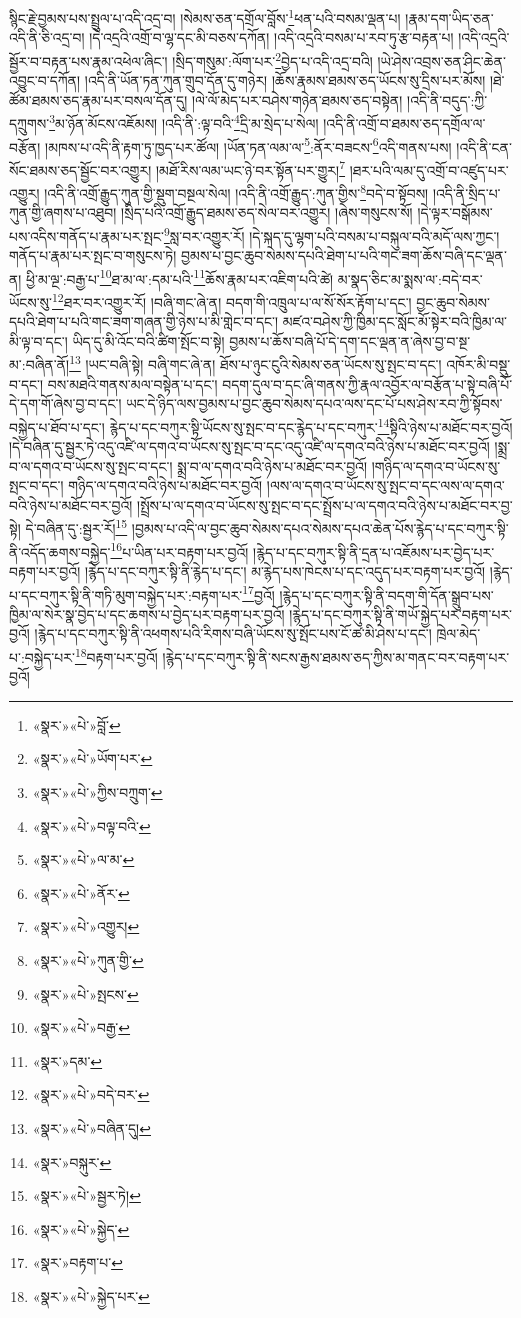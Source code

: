 སྙིང་རྗེ་བྱམས་པས་སྤྲུལ་པ་འདི་འདྲ་བ། །སེམས་ཅན་དགྲོལ་བློས་\footnote{«སྣར་»«པེ་»བློ་}ཕན་པའི་བསམ་ལྡན་པ། །རྣམ་དག་ཡིད་ཅན་འདི་ནི་ཅི་འདྲ་བ། །དེ་འདྲའི་འགྲོ་བ་ལྷ་དང་མི་བཅས་དཀོན། །འདི་འདྲའི་བསམ་པ་རབ་ཏུ་རྩ་བརྟན་པ། །འདི་འདྲའི་སྦྱོར་བ་བརྟན་པས་རྣམ་འཕེལ་ཞིང་། །སྲིད་གསུམ་:ལོག་པར་\footnote{«སྣར་»«པེ་»ཡོག་པར་}བྱེད་པ་འདི་འདྲ་བའི། །ཡེ་ཤེས་འབྲས་ཅན་ཤིང་ཆེན་འབྱུང་བ་དཀོན། །འདི་ནི་ཡོན་ཏན་ཀུན་གྲུབ་དོན་དུ་གཉེར། །ཆོས་རྣམས་ཐམས་ཅད་ཡོངས་སུ་དྲིས་པར་མོས། །ཐེ་ཚོམ་ཐམས་ཅད་རྣམ་པར་བསལ་དོན་དུ། །ལེ་ལོ་མེད་པར་བཤེས་གཉེན་ཐམས་ཅད་བསྟེན། །འདི་ནི་བདུད་:ཀྱི་དཀྲུགས་\footnote{«སྣར་»«པེ་»ཀྱིས་བཀྲུག་}མ་ཉོན་མོངས་འཇོམས། །འདི་ནི་:ལྟ་བའི་\footnote{«སྣར་»«པེ་»བལྟ་བའི་}དྲི་མ་སྲེད་པ་སེལ། །འདི་ནི་འགྲོ་བ་ཐམས་ཅད་དགྲོལ་ལ་བརྩོན། །མཁས་པ་འདི་ནི་རྟག་ཏུ་ཁྱད་པར་ཚོལ། །ཡོན་ཏན་ལམ་ལ་\footnote{«སྣར་»«པེ་»ལ་མ་}:ནོར་བཟངས་\footnote{«སྣར་»«པེ་»ནོར་}འདི་གནས་པས། །འདི་ནི་ངན་སོང་ཐམས་ཅད་སྦྱོང་བར་འགྱུར། །མཐོ་རིས་ལམ་ཡང་ཉེ་བར་སྟོན་པར་གྱུར།\footnote{«སྣར་»«པེ་»འགྱུར།} །ཐར་པའི་ལམ་དུ་འགྲོ་བ་འཛུད་པར་འགྱུར། །འདི་ནི་འགྲོ་རྒྱུད་ཀུན་གྱི་སྡུག་བསྔལ་སེལ། །འདི་ནི་འགྲོ་རྒྱུད་:ཀུན་གྱིས་\footnote{«སྣར་»«པེ་»ཀུན་གྱི་}བདེ་བ་སྟོབས། །འདི་ནི་སྲིད་པ་ཀུན་གྱི་ཞགས་པ་འཐུབ། །སྲིད་པའི་འགྲོ་རྒྱུད་ཐམས་ཅད་སེལ་བར་འགྱུར། །ཞེས་གསུངས་སོ། །དེ་ལྟར་བསྒོམས་པས་འདིས་གནོད་པ་རྣམ་པར་སྤང་\footnote{«སྣར་»«པེ་»སྤངས་}སླ་བར་འགྱུར་རོ། །དེ་སྐད་དུ་ལྷག་པའི་བསམ་པ་བསྐུལ་བའི་མདོ་ལས་ཀྱང་། གནོད་པ་རྣམ་པར་སྤང་བ་གསུངས་ཏེ། བྱམས་པ་བྱང་ཆུབ་སེམས་དཔའི་ཐེག་པ་པའི་གང་ཟག་ཆོས་བཞི་དང་ལྡན་ན། ཕྱི་མ་ལྔ་:བརྒྱ་པ་\footnote{«སྣར་»«པེ་»བརྒྱ་}ཐ་མ་ལ་:དམ་པའི་\footnote{«སྣར་»དམ་}ཆོས་རྣམ་པར་འཇིག་པའི་ཚེ། མ་སྣད་ཅིང་མ་སྨས་ལ་:བདེ་བར་ཡོངས་སུ་\footnote{«སྣར་»«པེ་»བདེ་བར་}ཐར་བར་འགྱུར་རོ། །བཞི་གང་ཞེ་ན། བདག་གི་འཁྲུལ་པ་ལ་སོ་སོར་རྟོག་པ་དང་། བྱང་ཆུབ་སེམས་དཔའི་ཐེག་པ་པའི་གང་ཟག་གཞན་གྱི་ཉེས་པ་མི་གླེང་བ་དང་། མཛའ་བཤེས་ཀྱི་ཁྱིམ་དང་སློང་མོ་སྟེར་བའི་ཁྱིམ་ལ་མི་ལྟ་བ་དང་། ཡིད་དུ་མི་འོང་བའི་ཚིག་སྤོང་བ་སྟེ། བྱམས་པ་ཆོས་བཞི་པོ་དེ་དག་དང་ལྡན་ན་ཞེས་བྱ་བ་སྔ་མ་:བཞིན་ནོ།\footnote{«སྣར་»«པེ་»བཞིན་དུ།} །ཡང་བཞི་སྟེ། བཞི་གང་ཞེ་ན། ཐོས་པ་ཉུང་ངུའི་སེམས་ཅན་ཡོངས་སུ་སྤང་བ་དང་། འཁོར་མི་བསྡུ་བ་དང་། བས་མཐའི་གནས་མལ་བསྟེན་པ་དང་། བདག་དུལ་བ་དང་ཞི་གནས་ཀྱི་རྣལ་འབྱོར་ལ་བརྩོན་པ་སྟེ་བཞི་པོ་དེ་དག་གོ་ཞེས་བྱ་བ་དང་། ཡང་དེ་ཉིད་ལས་བྱམས་པ་བྱང་ཆུབ་སེམས་དཔའ་ལས་དང་པོ་པས་ཤེས་རབ་ཀྱི་སྟོབས་བསྐྱེད་པ་ཐོབ་པ་དང་། རྙེད་པ་དང་བཀུར་སྟི་ཡོངས་སུ་སྤང་བ་དང་རྙེད་པ་དང་བཀུར་\footnote{«སྣར་»བསྐུར་}སྟིའི་ཉེས་པ་མཐོང་བར་བྱའོ། །དེ་བཞིན་དུ་སྦྱར་ཏེ་འདུ་འཛི་ལ་དགའ་བ་ཡོངས་སུ་སྤང་བ་དང་འདུ་འཛི་ལ་དགའ་བའི་ཉེས་པ་མཐོང་བར་བྱའོ། །སྨྲ་བ་ལ་དགའ་བ་ཡོངས་སུ་སྤང་བ་དང་། སྨྲ་བ་ལ་དགའ་བའི་ཉེས་པ་མཐོང་བར་བྱའོ། །གཉིད་ལ་དགའ་བ་ཡོངས་སུ་སྤང་བ་དང་། གཉིད་ལ་དགའ་བའི་ཉེས་པ་མཐོང་བར་བྱའོ། །ལས་ལ་དགའ་བ་ཡོངས་སུ་སྤང་བ་དང་ལས་ལ་དགའ་བའི་ཉེས་པ་མཐོང་བར་བྱའོ། །སྤྲོས་པ་ལ་དགའ་བ་ཡོངས་སུ་སྤང་བ་དང་སྤྲོས་པ་ལ་དགའ་བའི་ཉེས་པ་མཐོང་བར་བྱ་སྟེ། དེ་བཞིན་དུ་:སྦྱར་རོ།\footnote{«སྣར་»«པེ་»སྦྱར་ཏེ།} །བྱམས་པ་འདི་ལ་བྱང་ཆུབ་སེམས་དཔའ་སེམས་དཔའ་ཆེན་པོས་རྙེད་པ་དང་བཀུར་སྟི་ནི་འདོད་ཆགས་བསྐྱེད་\footnote{«སྣར་»«པེ་»སྐྱེད་}པ་ཡིན་པར་བརྟག་པར་བྱའོ། །རྙེད་པ་དང་བཀུར་སྟི་ནི་དྲན་པ་འཇོམས་པར་བྱེད་པར་བརྟག་པར་བྱའོ། །རྙེད་པ་དང་བཀུར་སྟི་ནི་རྙེད་པ་དང་། མ་རྙེད་པས་ཁེངས་པ་དང་འདུད་པར་བརྟག་པར་བྱའོ། །རྙེད་པ་དང་བཀུར་སྟི་ནི་གཏི་མུག་བསྐྱེད་པར་:བརྟག་པར་\footnote{«སྣར་»བརྟག་པ་}བྱའོ། །རྙེད་པ་དང་བཀུར་སྟི་ནི་བདག་གི་དོན་སྒྲུབ་པས་ཁྱིམ་ལ་སེར་སྣ་བྱེད་པ་དང་ཆགས་པ་བྱེད་པར་བརྟག་པར་བྱའོ། །རྙེད་པ་དང་བཀུར་སྟི་ནི་གཡོ་སྐྱེད་པར་བརྟག་པར་བྱའོ། །རྙེད་པ་དང་བཀུར་སྟི་ནི་འཕགས་པའི་རིགས་བཞི་ཡོངས་སུ་སྤོང་པས་ངོ་ཚ་མི་ཤེས་པ་དང་། ཁྲེལ་མེད་པ་:བསྐྱེད་པར་\footnote{«སྣར་»«པེ་»སྐྱེད་པར་}བརྟག་པར་བྱའོ། །རྙེད་པ་དང་བཀུར་སྟི་ནི་སངས་རྒྱས་ཐམས་ཅད་ཀྱིས་མ་གནང་བར་བརྟག་པར་བྱའོ། 